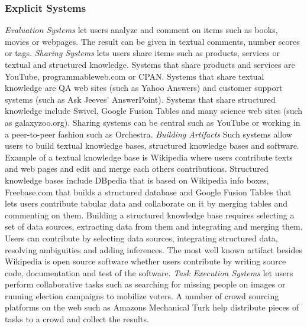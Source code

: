 \documentclass{sig-alternate}
\begin{document}
\subsubsection{Explicit Systems}
\textit{Evaluation Systems} let users analyze and comment on items such as books, movies or webpages. The result can be given in textual comments, number scores or tags.
\newline\newline
\textit{Sharing Systems} lets users share items such as products, services or textual and structured knowledge. Systems that share products and services are YouTube, programmableweb.com or CPAN. Systems that share textual knowledge are QA web sites (such as Yahoo Answers) and customer support systems (such as Ask Jeeves' AnswerPoint). Systems that share structured knowledge include Swivel, Google Fusion Tables and many science web sites (such as galaxyzoo.org). Sharing systems can be central such as YouTube or working in a peer-to-peer fashion such as Orchestra.
\newline\newline
\textit{Building Artifacts} Such systems allow users to build textual knowledge bases, structured knowledge bases and software. Example of a textual knowledge base is Wikipedia where users contribute texts and web pages and edit and merge each others contributions. Structured knowledge bases include DBpedia that is based on Wikipedia info boxes, Freebase.com that builds a structured database and Google Fusion Tables that lets users contribute tabular data and collaborate on it by merging tables and commenting on them. Building a structured knowledge base requires selecting a set of data sources, extracting data from them and integrating and merging them. Users can contribute by selecting data sources, integrating structured data, resolving ambiguities and adding inferences. The most well known artifact besides Wikipedia is open source software whether users contribute by writing source code, documentation and test of the software.
\newline\newline
\textit{Task Execution Systems} let users perform collaborative tasks such as searching for missing people on images or running election campaigns to mobilize voters. A number of crowd sourcing platforms on the  web such as Amazons Mechanical Turk help distribute pieces of tasks to a crowd and collect the results.
\end{document}
